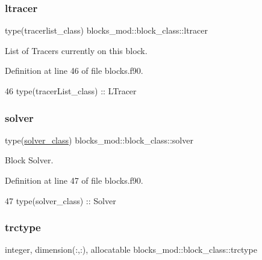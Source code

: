 \subsubsection{\texorpdfstring{ltracer}{ltracer}}
{\footnotesize\ttfamily type(tracerlist\+\_\+class) blocks\+\_\+mod\+::block\+\_\+class\+::ltracer\hspace{0.3cm}{\ttfamily [private]}}



List of Tracers currently on this block. 



Definition at line 46 of file blocks.\+f90.


\begin{DoxyCode}
46         \textcolor{keywordtype}{type}(tracerList\_class) :: LTracer
\end{DoxyCode}
\mbox{\label{structblocks__mod_1_1block__class_a081258113128b3bcdefdbeac4bc5d039}} 
\subsubsection{\texorpdfstring{solver}{solver}}
{\footnotesize\ttfamily type(\mbox{\hyperlink{structsolver__mod_1_1solver__class}{solver\+\_\+class}}) blocks\+\_\+mod\+::block\+\_\+class\+::solver\hspace{0.3cm}{\ttfamily [private]}}



Block Solver. 



Definition at line 47 of file blocks.\+f90.


\begin{DoxyCode}
47         \textcolor{keywordtype}{type}(solver\_class)     :: Solver
\end{DoxyCode}
\mbox{\label{structblocks__mod_1_1block__class_a3ad957b5a86ff6c774dc76521bf5126e}} 
\subsubsection{\texorpdfstring{trctype}{trctype}}
{\footnotesize\ttfamily integer, dimension(\+:,\+:), allocatable blocks\+\_\+mod\+::block\+\_\+class\+::trctype\hspace{0.3cm}{\ttfamily [private]}}



